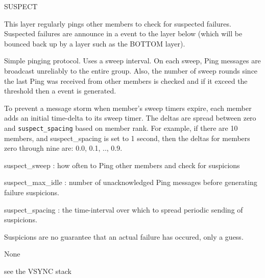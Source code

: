\begin{Layer}{SUSPECT}

This layer regularly pings other members to check for suspected
failures.  Suspected failures are announce in a  event to
the layer below (which will be bounced back up by a layer such as the
BOTTOM layer).

\begin{Protocol}
Simple pinging protocol.  Uses a sweep interval.  On each sweep, Ping
messages are broadcast unreliably to the entire group.  Also, the
number of sweep rounds since the last Ping was received from other
members is checked and if it exceed the  threshold
then a  event is generated.  

To prevent a message storm when member's sweep timers expire, each
member adds an initial time-delta to its sweep timer. The deltas are
spread between zero and {\tt suspect\_spacing} based on member rank.
For example, if there are 10 members, and suspect\_spacing is set to 1
second, then the deltas for members zero through nine are: 0.0, 0.1,
.., 0.9.
\end{Protocol}

\begin{Parameters}
\item 
suspect\_sweep : how often to Ping other members and check for suspicions
\item
suspect\_max\_idle : number of unacknowledged Ping messages before generating
failure suspicions.
\item 
suspect\_spacing : the time-interval over which to spread periodic
sending of suspicions.
\end{Parameters}

\begin{Properties}
\item
Suspicions are no guarantee that an actual failure has occured, only a guess.
\end{Properties}

\begin{Notes}
\item None
\end{Notes}

\begin{Sources}
\end{Sources}

\begin{GenEvent}
\end{GenEvent}

\begin{Testing}
\item see the VSYNC stack
\end{Testing}
\end{Layer}
